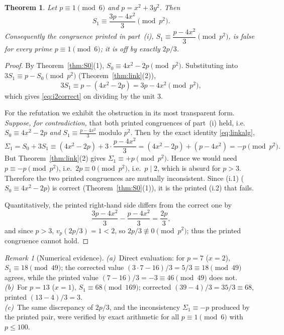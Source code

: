 \documentclass[12pt]{article}
\newtheorem{theorem}{Theorem}
\theoremstyle{remark}
\newtheorem{remark}{Remark}
\begin{document}
\begin{theorem}\label{thm:i2}
Let $p\equiv1\pmod6$ and $p=x^2+3y^2$.  Then
\begin{equation}\label{eq:i2correct}
S_1\equiv\frac{3p-4x^2}{3}\pmod{p^2}.
\end{equation}
Consequently the congruence printed in part~(i),
$S_1\equiv\dfrac{p-4x^2}{3}\pmod{p^2}$, is \emph{false} for every prime
$p\equiv1\pmod6$; it is off by exactly $2p/3$.
\end{theorem}

\begin{proof}
By Theorem~\ref{thm:S0}(1), $S_0\equiv4x^2-2p\pmod{p^2}$.  Substituting into
$3S_1\equiv p-S_0\pmod{p^2}$ (Theorem~\ref{thm:link}(2)),
\[
3S_1\equiv p-(4x^2-2p)=3p-4x^2\pmod{p^2},
\]
which gives \eqref{eq:i2correct} on dividing by the unit $3$.

For the refutation we exhibit the obstruction in its most transparent form.
\emph{Suppose, for contradiction,} that both printed congruences of part~(i)
held, i.e.\ $S_0\equiv 4x^2-2p$ \emph{and} $S_1\equiv\frac{p-4x^2}{3}$ modulo
$p^2$.  Then by the exact identity \eqref{eq:linkalg},
\[
\Sigma_1=S_0+3S_1\equiv(4x^2-2p)+3\cdot\frac{p-4x^2}{3}
=(4x^2-2p)+(p-4x^2)=-p\pmod{p^2}.
\]
But Theorem~\ref{thm:link}(2) gives $\Sigma_1\equiv +p\pmod{p^2}$.  Hence we
would need $p\equiv-p\pmod{p^2}$, i.e.\ $2p\equiv0\pmod{p^2}$, i.e.\
$p\mid2$, which is absurd for $p>3$.  Therefore the two printed congruences are
mutually inconsistent.  Since (i.1) ($S_0\equiv4x^2-2p$) is correct
(Theorem~\ref{thm:S0}(1)), it is the printed (i.2) that fails.

Quantitatively, the printed right-hand side differs from the correct one by
\[
\frac{3p-4x^2}{3}-\frac{p-4x^2}{3}=\frac{2p}{3},
\]
and since $p>3$, $v_p(2p/3)=1<2$, so $2p/3\not\equiv0\pmod{p^2}$; thus the
printed congruence cannot hold.
\end{proof}

\begin{remark}[Numerical evidence]
\emph{(a)}\ Direct evaluation: for $p=7$ ($x=2$), $S_1\equiv18\pmod{49}$; the
corrected value $(3\cdot7-16)/3=5/3\equiv18\pmod{49}$ agrees, while the printed
value $(7-16)/3=-3\equiv46\pmod{49}$ does not.\\
\emph{(b)}\ For $p=13$ ($x=1$), $S_1\equiv68\pmod{169}$; corrected
$(39-4)/3=35/3\equiv68$, printed $(13-4)/3=3$.\\
\emph{(c)}\ The same discrepancy of $2p/3$, and the inconsistency
$\Sigma_1\equiv -p$ produced by the printed pair, were verified by exact
arithmetic for all $p\equiv1\pmod6$ with $p\le100$.
\end{remark}
\end{document}
